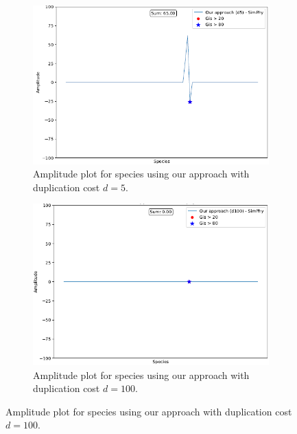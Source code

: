 \documentclass[10pt]{article}
\begin{document}
\begin{figure}[h!]
    \begin{subfigure}[b]{0.48\textwidth}
        \centering
        \includegraphics[width=\textwidth]{figs/greedy5-amp.PNG}
        \caption{Amplitude plot for species using our approach with duplication cost $d=5$.}
        \label{fig:amp-b}
    \end{subfigure}
    \hfill
    \begin{subfigure}[b]{0.48\textwidth}
        \centering
        \includegraphics[width=\textwidth]{figs/greedy100-amp.PNG}
        \caption{Amplitude plot for species using our approach with duplication cost $d=100$.}
        \label{fig:amp-c}
    \end{subfigure}
    

\end{figure}
\end{document}
